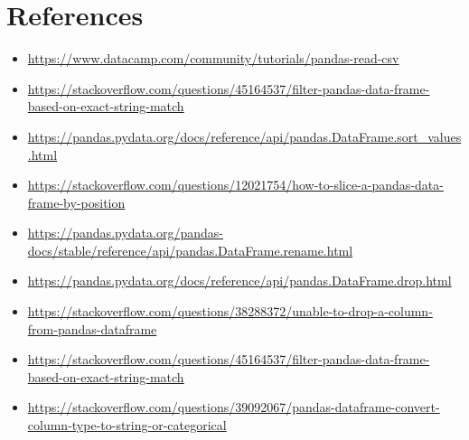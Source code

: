 \documentclass[12pt]{article}
\begin{document}
\section*{References}
\begin{itemize}
\item {\url{https://www.datacamp.com/community/tutorials/pandas-read-csv}}
\item {\url{https://stackoverflow.com/questions/45164537/filter-pandas-data-frame-based-on-exact-string-match}}
\item {\url{https://pandas.pydata.org/docs/reference/api/pandas.DataFrame.sort_values.html}}
\item {\url{https://stackoverflow.com/questions/12021754/how-to-slice-a-pandas-data-frame-by-position}}
\item {\url{https://pandas.pydata.org/pandas-docs/stable/reference/api/pandas.DataFrame.rename.html}}
\item {\url{https://pandas.pydata.org/docs/reference/api/pandas.DataFrame.drop.html}}
\item {\url{https://stackoverflow.com/questions/38288372/unable-to-drop-a-column-from-pandas-dataframe}}
\item {\url{https://stackoverflow.com/questions/45164537/filter-pandas-data-frame-based-on-exact-string-match}}
\item {\url{https://stackoverflow.com/questions/39092067/pandas-dataframe-convert-column-type-to-string-or-categorical}}

\end{itemize}
\end{document}
